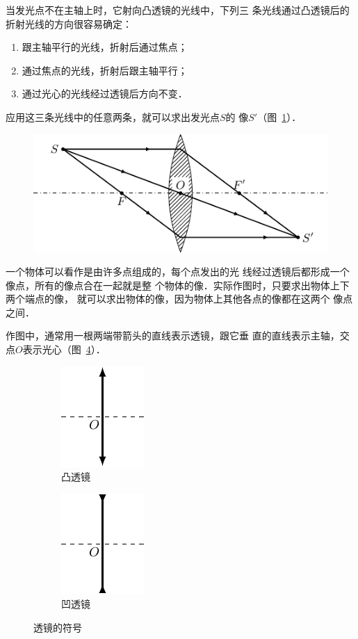 当发光点不在主轴上时，它射向凸透镜的光线中，下列三
条光线通过凸透镜后的折射光线的方向很容易确定：
\begin{enumerate}
    \item   跟主轴平行的光线，折射后通过焦点；
    \item 通过焦点的光线，折射后跟主轴平行；
    \item 通过光心的光线经过透镜后方向不变．
\end{enumerate}

应用这三条光线中的任意两条，就可以求出发光点$S$的
像$S'$（图~\ref{fig_C_5-40}）．
\begin{figure}[htbp]
    \centering
    \includegraphics{fig/C/5-40.pdf}
    \caption{}\label{fig_C_5-40}
\end{figure}

一个物体可以看作是由许多点组成的，每个点发出的光
线经过透镜后都形成一个像点，所有的像点合在一起就是整
个物体的像．实际作图时，只要求出物体上下两个端点的像，
就可以求出物体的像，因为物体上其他各点的像都在这两个
像点之间．

作图中，通常用一根两端带箭头的直线表示透镜，跟它垂
直的直线表示主轴，交点$O$表示光心（图~\ref{fig_C_5-41}）．
\begin{figure}[htbp]
    \centering
    \begin{subfigure}{0.2\linewidth}
        \centering
        \includegraphics{fig/C/5-41a.pdf}
        \caption{凸透镜}\label{fig_C_5-41a}
    \end{subfigure}
    \hfil
    \begin{subfigure}{0.2\linewidth}
        \centering
        \includegraphics{fig/C/5-41b.pdf}
        \caption{凹透镜}\label{fig_C_5-41b}
    \end{subfigure}
    \caption{透镜的符号}\label{fig_C_5-41}
\end{figure}

